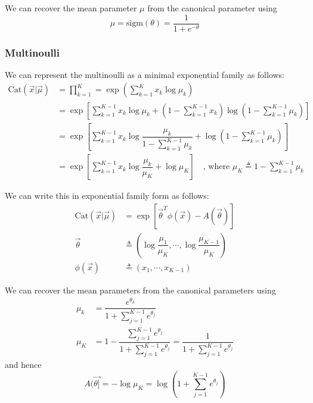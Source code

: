 We can recover the mean parameter $\mu$ from the canonical parameter using
\begin{equation}
\mu=\mathrm{sigm}(\theta)=\dfrac{1}{1+e^{-\theta}}
\end{equation}


\subsubsection{Multinoulli}
We can represent the multinoulli as a minimal exponential family as follows:
\begin{align}
\mathrm{Cat}(\vec{x}|\vec{\mu}) & = \prod\limits_{k=1}^K = \exp\left(\sum\limits_{k=1}^K x_k\log\mu_k\right) \nonumber \\
    & = \exp\left[\sum\limits_{k=1}^{K-1} x_k\log\mu_k+(1-\sum\limits_{k=1}^{K-1} x_k)\log(1-\sum\limits_{k=1}^{K-1} \mu_k)\right] \nonumber \\
	& = \exp\left[\sum\limits_{k=1}^{K-1} x_k\log\dfrac{\mu_k}{1-\sum_{k=1}^{K-1} \mu_k} + \log(1-\sum\limits_{k=1}^{K-1} \mu_k) \right] \nonumber \\
	& = \exp\left[\sum\limits_{k=1}^{K-1} x_k\log\dfrac{\mu_k}{\mu_K}+\log\mu_K\right] \quad \text{, where } \mu_K \triangleq 1-\sum\limits_{k=1}^{K-1} \mu_k \nonumber
\end{align}

We can write this in exponential family form as follows:
\begin{align}
\mathrm{Cat}(\vec{x}|\vec{\mu}) & = \exp[\vec{\theta}^T\phi(\vec{x})-A(\vec{\theta})] \\
\vec{\theta} & \triangleq (\log\dfrac{\mu_1}{\mu_K},\cdots,\log\dfrac{\mu_{K-1}}{\mu_K}) \\
\phi(\vec{x}) & \triangleq (x_1,\cdots,x_{K-1})
\end{align}

We can recover the mean parameters from the canonical parameters using
\begin{align}
\mu_k & = \dfrac{e^{\theta_k}}{1+\sum_{j=1}^{K-1} e^{\theta_j}} \\
\mu_K & = 1- \dfrac{\sum_{j=1}^{K-1} e^{\theta_j}}{1+\sum_{j=1}^{K-1} e^{\theta_j}}=\dfrac{1}{1+\sum_{j=1}^{K-1} e^{\theta_j}}
\end{align}
and hence
\begin{equation}
A(\vec{\theta]} = -\log\mu_K=\log(1+\sum\limits_{j=1}^{K-1} e^{\theta_j})
\end{equation}


